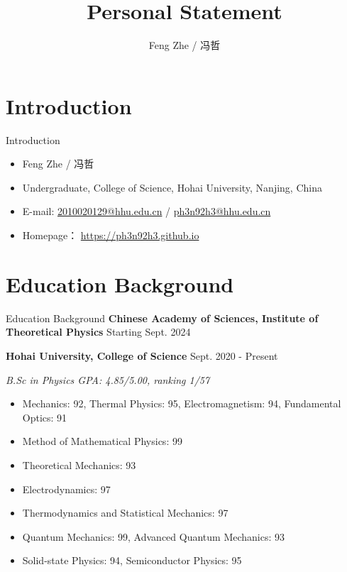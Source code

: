 \documentclass[9pt,aspectratio=169,hyperref=colorlinks]{beamer}
\title{Personal Statement}
\institute{College of Science, Hohai University}
\author{Feng Zhe / 冯哲}
\begin{document}
\frame{\titlepage}

\section{Introduction}
\begin{frame}{Introduction}
    \begin{itemize}
        \item Feng Zhe / 冯哲
        \item Undergraduate, College of Science, Hohai University, Nanjing, China
        \item E-mail: \href{mailto:2010020129@hhu.edu.cn}{2010020129@hhu.edu.cn} / \href{mailto:ph3n92h3@hhu.edu.cn}{ph3n92h3@hhu.edu.cn}
        \item Homepage： \href{https://ph3n92h3.github.io}{https://ph3n92h3.github.io}
    \end{itemize}
\end{frame}

\section{Education Background}
\begin{frame}{Education Background}
    \textbf{Chinese Academy of Sciences, Institute of Theoretical Physics} \hfill Starting Sept. 2024

    \textbf{Hohai University, College of Science} \hfill Sept. 2020 - Present

    \textit{B.Sc in Physics \hfill GPA: 4.85/5.00, ranking 1/57}

    \begin{itemize}
        \item Mechanics: 92, Thermal Physics: 95, Electromagnetism: 94, Fundamental Optics: 91
        \item Method of Mathematical Physics: 99
        \item Theoretical Mechanics: 93
        \item Electrodynamics: 97
        \item Thermodynamics and Statistical Mechanics: 97
        \item Quantum Mechanics: 99, Advanced Quantum Mechanics: 93
        \item Solid-state Physics: 94, Semiconductor Physics: 95
    \end{itemize}
\end{frame}
\end{document}
